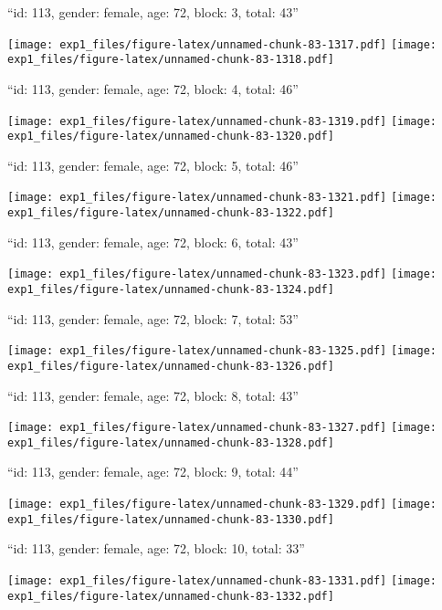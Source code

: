 \documentclass[11pt,,]{article}
\begin{document}
\newpage
[1] 

``id: 113, gender: female, age: 72, block: 3, total: 43''

\texttt{[image: exp1\_files/figure-latex/unnamed-chunk-83-1317.pdf]}
\texttt{[image: exp1\_files/figure-latex/unnamed-chunk-83-1318.pdf]}

\newpage
[1] 

``id: 113, gender: female, age: 72, block: 4, total: 46''

\texttt{[image: exp1\_files/figure-latex/unnamed-chunk-83-1319.pdf]}
\texttt{[image: exp1\_files/figure-latex/unnamed-chunk-83-1320.pdf]}

\newpage
[1] 

``id: 113, gender: female, age: 72, block: 5, total: 46''

\texttt{[image: exp1\_files/figure-latex/unnamed-chunk-83-1321.pdf]}
\texttt{[image: exp1\_files/figure-latex/unnamed-chunk-83-1322.pdf]}

\newpage
[1] 

``id: 113, gender: female, age: 72, block: 6, total: 43''

\texttt{[image: exp1\_files/figure-latex/unnamed-chunk-83-1323.pdf]}
\texttt{[image: exp1\_files/figure-latex/unnamed-chunk-83-1324.pdf]}

\newpage
[1] 

``id: 113, gender: female, age: 72, block: 7, total: 53''

\texttt{[image: exp1\_files/figure-latex/unnamed-chunk-83-1325.pdf]}
\texttt{[image: exp1\_files/figure-latex/unnamed-chunk-83-1326.pdf]}

\newpage
[1] 

``id: 113, gender: female, age: 72, block: 8, total: 43''

\texttt{[image: exp1\_files/figure-latex/unnamed-chunk-83-1327.pdf]}
\texttt{[image: exp1\_files/figure-latex/unnamed-chunk-83-1328.pdf]}

\newpage
[1] 

``id: 113, gender: female, age: 72, block: 9, total: 44''

\texttt{[image: exp1\_files/figure-latex/unnamed-chunk-83-1329.pdf]}
\texttt{[image: exp1\_files/figure-latex/unnamed-chunk-83-1330.pdf]}

\newpage
[1] 

``id: 113, gender: female, age: 72, block: 10, total: 33''

\texttt{[image: exp1\_files/figure-latex/unnamed-chunk-83-1331.pdf]}
\texttt{[image: exp1\_files/figure-latex/unnamed-chunk-83-1332.pdf]}
\end{document}
